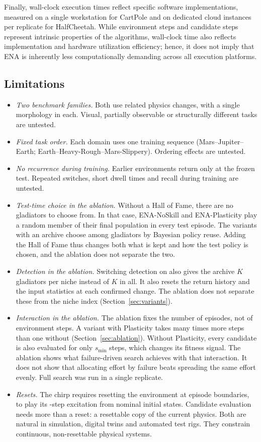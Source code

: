 Finally, wall-clock execution times reflect specific software implementations, measured on a single workstation for CartPole and on dedicated cloud instances per replicate for HalfCheetah. While environment steps and candidate steps represent intrinsic properties of the algorithms, wall-clock time also reflects implementation and hardware utilization efficiency; hence, it does not imply that ENA is inherently less computationally demanding across all execution platforms.

\subsection{Limitations}
\begin{itemize}
\item \textit{Two benchmark families.} Both use related physics changes, with a single morphology in each. Visual, partially observable or structurally different tasks are untested.
\item \textit{Fixed task order.} Each domain uses one training sequence (Mars--Jupiter--Earth; Earth--Heavy-Rough--Mars-Slippery). Ordering effects are untested.
\item \textit{No recurrence during training.} Earlier environments return only at the frozen test. Repeated switches, short dwell times and recall during training are untested.
\item \textit{Test-time choice in the ablation.} Without a Hall of Fame, there are no gladiators to choose from. In that case, ENA-NoSkill and ENA-Plasticity play a random member of their final population in every test episode. The variants with an archive choose among gladiators by Bayesian policy reuse. Adding the Hall of Fame thus changes both what is kept and how the test policy is chosen, and the ablation does not separate the two.
\item \textit{Detection in the ablation.} Switching detection on also gives the archive $K$ gladiators per niche instead of $K$ in all. It also resets the return history and the input statistics at each confirmed change. The ablation does not separate these from the niche index (Section~\ref{sec:variants}).
\item \textit{Interaction in the ablation.} The ablation fixes the number of episodes, not of environment steps. A variant with Plasticity takes many times more steps than one without (Section~\ref{sec:ablation}). Without Plasticity, every candidate is also evaluated for only $s_{\min}$ steps, which changes its fitness signal. The ablation shows what failure-driven search achieves with that interaction. It does not show that allocating effort by failure beats spreading the same effort evenly. Full search was run in a single replicate.
\item \textit{Resets.} The chirp requires resetting the environment at episode boundaries, to play its -step excitation from nominal initial states. Candidate evaluation needs more than a reset: a resettable copy of the current physics. Both are natural in simulation, digital twins and automated test rigs. They constrain continuous, non-resettable physical systems.
\end{itemize}
